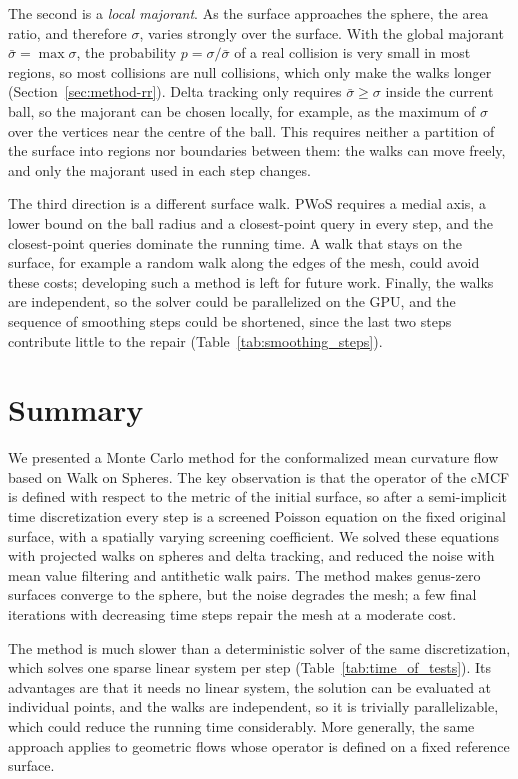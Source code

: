 \documentclass[
]{elteiktdk}[2024/04/26]
\begin{document}
	The second is a \textit{local majorant}. As the surface approaches the sphere, the area ratio, and therefore $\sigma$, varies strongly over the surface. With the global majorant $\bar{\sigma} = \max \sigma$, the probability $p = \sigma / \bar{\sigma}$ of a real collision is very small in most regions, so most collisions are null collisions, which only make the walks longer (Section~\ref{sec:method-rr}). Delta tracking only requires $\bar{\sigma} \ge \sigma$ inside the current ball, so the majorant can be chosen locally, for example, as the maximum of $\sigma$ over the vertices near the centre of the ball. This requires neither a partition of the surface into regions nor boundaries between them: the walks can move freely, and only the majorant used in each step changes.
	
	The third direction is a different surface walk. PWoS requires a medial axis, a lower bound on the ball radius and a closest-point query in every step, and the closest-point queries dominate the running time. A walk that stays on the surface, for example a random walk along the edges of the mesh, could avoid these costs; developing such a method is left for future work. Finally, the walks are independent, so the solver could be parallelized on the GPU, and the sequence of smoothing steps could be shortened, since the last two steps contribute little to the repair (Table~\ref{tab:smoothing_steps}).
	
	\section{Summary}
	
	We presented a Monte Carlo method for the conformalized mean curvature flow based on Walk on Spheres. The key observation is that the operator of the cMCF is defined with respect to the metric of the initial surface, so after a semi-implicit time discretization every step is a screened Poisson equation on the fixed original surface, with a spatially varying screening coefficient. We solved these equations with projected walks on spheres and delta tracking, and reduced the noise with mean value filtering and antithetic walk pairs. The method makes genus-zero surfaces converge to the sphere, but the noise degrades the mesh; a few final iterations with decreasing time steps repair the mesh at a moderate cost.
	
	The method is much slower than a deterministic solver of the same discretization, which solves one sparse linear system per step (Table~\ref{tab:time_of_tests}). Its advantages are that it needs no linear system, the solution can be evaluated at individual points, and the walks are independent, so it is trivially parallelizable, which could reduce the running time considerably. More generally, the same approach applies to geometric flows whose operator is defined on a fixed reference surface.
	
\end{document}
